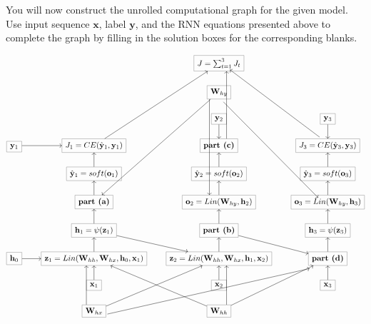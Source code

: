\documentclass[11pt,addpoints,answers]{exam}
\newcommand{\hv}{\mathbf{h}}
\newcommand{\ov}{\mathbf{o}}
\newcommand{\xv}{\mathbf{x}}
\newcommand{\yv}{\mathbf{y}}
\newcommand{\zv}{\mathbf{z}}
\newcommand{\Wv}{\mathbf{W}}
\begin{document}
\begin{questions}
\begin{parts}
\begin{subparts}

\clearpage
    \subpart[4] You will now construct the unrolled computational graph for the given model.
    Use input sequence $\xv$, label $\yv$, and the RNN equations presented above to complete the graph by filling in the solution boxes for the corresponding blanks.\\

    \begin{center}
    \[\begin{tikzcd}[cells={nodes={draw=gray}}]
	&& {J = \sum_{t=1}^3 J_t} \\
	&& {\Wv_{hy}} \\
	&& {\yv_2} & {\yv_3} \\
	{\yv_1} & {J_1 = CE(\hat{\yv}_{1}, \yv_1)} & {\textbf{part (c)}} & {J_3 = CE(\hat{\yv}_{3}, \yv_3)} \\
	& {\hat{\yv}_1 = soft(\ov_1)} & {\hat{\yv}_2 = soft(\ov_2)} & {\hat{\yv}_3 = soft(\ov_3)} \\
	& {\textbf{part (a)}} & {\ov_2 = Lin(\Wv_{hy}, \hv_2)} & {\ov_3 = Lin(\Wv_{hy}, \hv_3)} \\
	& {\hv_1 = \psi(\zv_1)} & {\textbf{part (b)}} & {\hv_3 = \psi(\zv_3)} \\
	{\hv_0} & {\zv_1 = Lin(\Wv_{hh}, \Wv_{hx},\hv_0,\xv_1)} & {\zv_2 = Lin(\Wv_{hh}, \Wv_{hx},\hv_1,\xv_2)} & {\textbf{part (d)}} \\
	& {\xv_1} & {\xv_2} & {\xv_3} \\
	& {\Wv_{hx}} & {\Wv_{hh}}
	\arrow[from=8-1, to=8-2]
	\arrow[from=9-2, to=8-2]
	\arrow[from=8-2, to=7-2]
	\arrow[from=7-2, to=8-3]
	\arrow[from=7-2, to=6-2]
	\arrow[from=6-2, to=5-2]
	\arrow[from=5-2, to=4-2]
	\arrow[from=4-1, to=4-2]
	\arrow[from=9-3, to=8-3]
	\arrow[from=8-3, to=7-3]
	\arrow[from=7-3, to=6-3]
	\arrow[from=6-3, to=5-3]
	\arrow[from=5-3, to=4-3]
	\arrow[from=3-3, to=4-3]
	\arrow[from=3-4, to=4-4]
	\arrow[from=5-4, to=4-4]
	\arrow[from=6-4, to=5-4]
	\arrow[from=7-4, to=6-4]
	\arrow[from=8-4, to=7-4]
	\arrow[from=7-3, to=8-4]
	\arrow[from=9-4, to=8-4]
	\arrow[shift left=4, from=10-2, to=8-2]
	\arrow[from=10-2, to=8-3]
	\arrow[from=10-3, to=8-2]
	\arrow[shift right=4, from=10-3, to=8-3]
	\arrow[from=10-3, to=8-4]
	\arrow[shift right=2, from=2-3, to=6-4]
	\arrow[from=2-3, to=6-2]
	\arrow[shift right=5, from=2-3, to=6-3]
	\arrow[from=4-2, to=1-3]
	\arrow[shift right=4, from=4-3, to=1-3]
	\arrow[shift right, from=4-4, to=1-3]
	\arrow[shift right=3, from=10-2, to=8-4]
\end{tikzcd}\]

\end{center}
\end{subparts}
\end{parts}
\end{questions}
\end{document}
